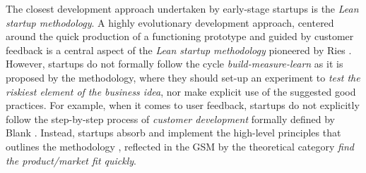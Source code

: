 \documentclass[10pt,journal,letterpaper,compsoc]{IEEEtran}
\begin{document}
The closest development approach undertaken by early-stage startups is 
the \textit{Lean startup methodology}.  A highly evolutionary development 
approach, centered around the quick production of a functioning prototype and 
guided by customer feedback is a central aspect of the \textit{Lean startup 
methodology} pioneered by Ries \cite{Ries2011}. However, startups do not 
formally follow the cycle \textit{build-measure-learn} as it is proposed by the 
methodology, where they should set-up an experiment to \textit{test the riskiest 
element of the business idea}, nor make explicit use of the suggested good 
practices.
For example, when it comes to user feedback, startups do 
not explicitly follow the step-by-step process of \textit{customer development}
formally defined by Blank \cite{Blank2005}. Instead, startups absorb and 
implement the high-level principles that outlines the methodology%
, reflected in the GSM by the theoretical category \textit{find the 
product/market fit quickly}.


\end{document}

